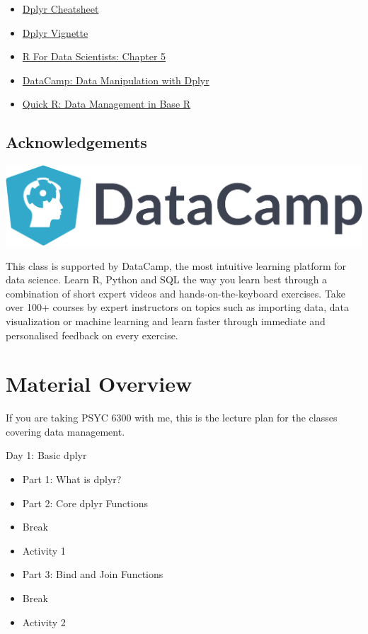 \documentclass[]{book}
\providecommand{\tightlist}{%
  \setlength{\itemsep}{0pt}\setlength{\parskip}{0pt}}
\theoremstyle{definition}
\theoremstyle{definition}
\theoremstyle{definition}
\theoremstyle{remark}
\begin{document}
\begin{itemize}
\tightlist
\item
  \href{https://github.com/rstudio/cheatsheets/blob/master/data-transformation.pdf}{Dplyr Cheatsheet}
\item
  \href{https://cran.r-project.org/web/packages/dplyr/vignettes/dplyr.html}{Dplyr Vignette}
\item
  \href{http://r4ds.had.co.nz/transform.html}{R For Data Scientists: Chapter 5}
\item
  \href{https://www.datacamp.com/courses/dplyr-data-manipulation-r-tutorial}{DataCamp: Data Manipulation with Dplyr}
\item
  \href{https://www.statmethods.net/management/variables.html}{Quick R: Data Management in Base R}
\end{itemize}

\hypertarget{acknowledgements}{%
\section{Acknowledgements}\label{acknowledgements}}

\includegraphics[width=19.03in]{suppl/DataCamp}

This class is supported by DataCamp, the most intuitive learning platform for data science. Learn R, Python and SQL the way you learn best through a combination of short expert videos and hands-on-the-keyboard exercises. Take over 100+ courses by expert instructors on topics such as importing data, data visualization or machine learning and learn faster through immediate and personalised feedback on every exercise.

\hypertarget{material-overview}{%
\chapter{Material Overview}\label{material-overview}}

If you are taking PSYC 6300 with me, this is the lecture plan for the classes covering data management.

Day 1: Basic dplyr

\begin{itemize}
\tightlist
\item
  Part 1: What is dplyr?
\item
  Part 2: Core dplyr Functions
\item
  Break
\item
  Activity 1
\item
  Part 3: Bind and Join Functions
\item
  Break
\item
  Activity 2
\end{itemize}
\end{document}
